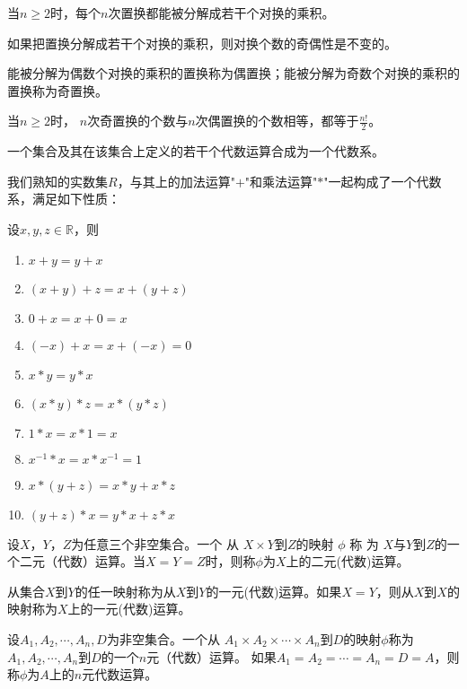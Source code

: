    \begin{Thm}
    当$n\geq 2$时，每个$n$次置换都能被分解成若干个对换的乘积。
   \end{Thm}
   \begin{Thm}
    如果把置换分解成若干个对换的乘积，则对换个数的奇偶性是不变的。
  \end{Thm}
  \begin{Def}
    能被分解为偶数个对换的乘积的置换称为偶置换；能被分解为奇数个对换的乘积的置换称为奇置换。
  \end{Def}
    \begin{Thm}
    当$n \geq 2$时， $n$次奇置换的个数与$n$次偶置换的个数相等，都等于$\frac{n!}{2}$。
  \end{Thm}
      \begin{Def}
    一个集合及其在该集合上定义的若干个代数运算合成为一个代数系。
  \end{Def}
我们熟知的实数集$R$，与其上的加法运算"$+$"和乘法运算"$*$"一起构成了一个代数系，满足如下性质：
  \begin{Thm}
    设$x, y, z \in \mathbb{R}$，则
   \begin{enumerate}
   \item   $x + y = y + x$
   \item   $(x + y) + z = x + (y + z)$
   \item   $0 + x = x + 0 = x$
   \item   $(-x) + x =x + (-x) = 0$
   \item   $x * y = y * x$
   \item   $(x * y) * z = x * (y *z)$
   \item   $1 * x = x * 1 = x$
   \item   $x^{-1} * x = x * x^{-1} = 1$
   \item   $x* (y + z) = x * y + x * z$
   \item   $(y + z) * x = y * x + z * x$
    \end{enumerate}
  \end{Thm}
  \begin{Def}
    设$X$，$Y$，$Z$为任意三个非空集合。一个 从 $X\times Y$到$Z$的映射 $\phi$ 称 为 $X$与$Y$到$Z$的一个二元（代数）运算。当$X=Y=Z$时，则称$\phi$为$X$上的二元(代数)运算。
  \end{Def}
  \begin{Def}
    从集合$X$到$Y$的任一映射称为从$X$到$Y$的一元(代数)运算。如果$X=Y$，则从$X$到$X$的映射称为$X$上的一元(代数)运算。
  \end{Def}
  \begin{Def}
    设$A_1, A_2, \cdots, A_n, D$为非空集合。一个从 $A_1\times A_2\times \cdots \times A_n$到$D$的映射$\phi$称为$A_1, A_2, \cdots, A_n$到$D$的一个$n$元（代数）运算。
    如果$A_1=A_2=\cdots=A_n=D=A$，则称$\phi$为$A$上的$n$元代数运算。
  \end{Def}

